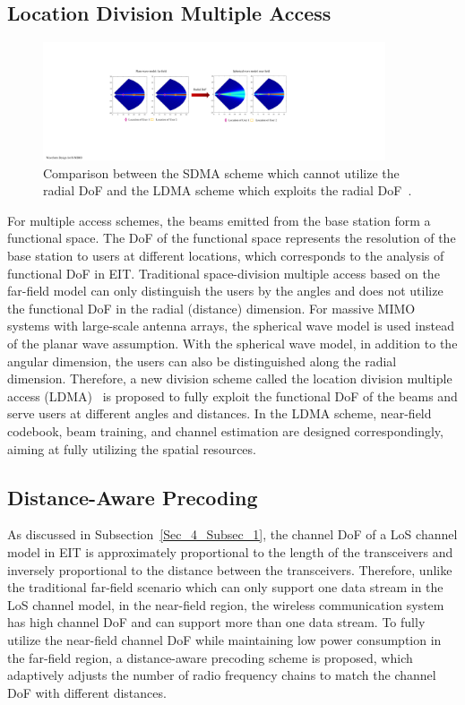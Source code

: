 \documentclass[journal,twocolumn]{IEEEtran}
\begin{document}
\subsection{Location Division Multiple Access}
\begin{figure}[t]
	\centering 
	\includegraphics[width=0.9\textwidth]{figures/LDMA.pdf} 
	\caption{Comparison between the SDMA scheme which cannot utilize the radial DoF and the LDMA scheme which exploits the radial DoF~\cite{wu2022multiple}. }
	\label{fig:LDMA}
\end{figure}
For multiple access schemes, the beams emitted from the base station form a functional space. 
The DoF of the functional space represents the resolution of the base station to users at different locations, which corresponds to the analysis of functional DoF in EIT. 	%
Traditional space-division multiple access based on the far-field model can only distinguish the users by the angles and does not utilize the functional DoF in the radial (distance) dimension. 
For massive MIMO systems with large-scale antenna arrays, the spherical wave model is used instead of the planar wave assumption. 
With the spherical wave model, in addition to the angular dimension, the users can also be distinguished along the radial dimension. 
Therefore, a new division scheme called the location division multiple access (LDMA)~\cite{wu2022multiple} is proposed to fully exploit the functional DoF of the beams and serve users at different angles and distances. 
In the LDMA scheme, near-field codebook, beam training, and channel estimation are designed correspondingly, aiming at fully utilizing the spatial resources. 

\subsection{Distance-Aware Precoding}
As discussed in Subsection~\ref{Sec_4_Subsec_1}, the channel DoF of a LoS channel model in EIT is approximately proportional to the length of the transceivers and inversely proportional to the distance between the transceivers. 
Therefore, unlike the traditional far-field scenario which can only support one data stream in the LoS channel model, in the near-field region, the wireless communication system has high channel DoF and can support more than one data stream.
To fully utilize the near-field channel DoF while maintaining low power consumption in the far-field region, a distance-aware precoding scheme is proposed, which adaptively adjusts the number of radio frequency chains to match the channel DoF with different distances.   
\end{document}
